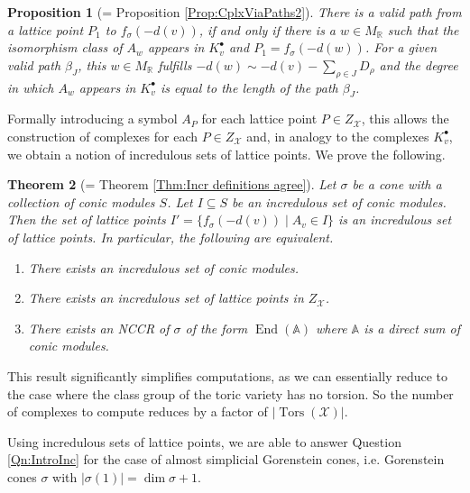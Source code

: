 \documentclass[reqno, 12pt]{amsart}
\newtheorem{theorem}{Theorem}[section]
\newtheorem{proposition}[theorem]{Proposition}
\theoremstyle{definition}
\numberwithin{equation}{section}
\newcommand{\newterm}{\textsf}
\newcommand{\R}{\mathbb{R}}
\newcommand{\End}{\operatorname{End}}
\begin{document}
\begin{proposition}[= Proposition \ref{Prop:CplxViaPaths2}]
    There is a valid path from a lattice point $P_1$ to $f_\sigma(-d(v))$, if and only if there is a $w\in M_\R$ such that the isomorphism class of $A_w$ appears in $K_v^\bullet$ and $P_1=f_\sigma(-d(w))$. For a given valid path $\beta_J$, this $w\in M_\R$ fulfills $-d(w)\sim -d(v)-\sum_{\rho\in J}D_\rho$ and the degree in which $A_w$ appears in $K_v^\bullet$ is equal to the length of the path $\beta_J$.
\end{proposition}


Formally introducing a symbol $A_P$ for each lattice point $P\in Z_{\mathcal{X}}$, this allows the construction of complexes for each $P\in Z_{\mathcal{X}}$ and, in analogy to the complexes $K_v^\bullet$, we obtain a notion of incredulous sets of lattice points. We prove the following.

\begin{theorem}[= Theorem \ref{Thm:Incr definitions agree}]
    Let $\sigma$ be a cone with a collection of conic modules $S$. Let $I\subseteq S$ be an incredulous set of conic modules. Then the set of lattice points $I'=\{f_\sigma(-d(v))\mid A_v\in I\}$ is an incredulous set of lattice points. In particular, the following are equivalent.
    \begin{enumerate}
        \item There exists an incredulous set of conic modules.
        \item There exists an incredulous set of lattice points in $Z_\mathcal{X}$.
        \item There exists an NCCR of $\sigma$ of the form $\End(\mathbb{A})$ where $\mathbb{A}$ is a direct sum of conic modules.
    \end{enumerate}
\end{theorem}

This result significantly simplifies computations, as we can essentially reduce to the case where the class group of the toric variety has no torsion. So the number of complexes to compute reduces by a factor of $|\operatorname{Tors}(\mathcal{X})|$. 

Using incredulous sets of lattice points, we are able to answer Question \ref{Qn:IntroInc} for the case of \newterm{almost simplicial} Gorenstein cones, i.e. Gorenstein cones $\sigma$ with $|\sigma(1)|=\dim\sigma+1$.
\end{document}
